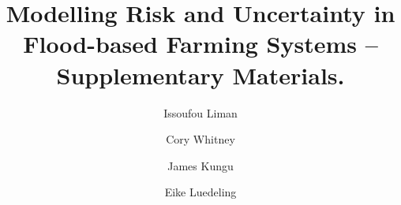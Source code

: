 \documentclass[]{elsarticle} %
\begin{document}
\begin{frontmatter}

  \title{Modelling Risk and Uncertainty in Flood-based Farming Systems -- Supplementary Materials.}
    \author[ICRAF,KU]{Issoufou Liman}
    \author[ICRAF,ZEF]{Cory Whitney}
    \author[KU]{James Kungu}
    \author[INRES]{Eike Luedeling}
      \address[KU]{Kenyatta University, Department of Environmental Sciences}
    \address[ICRAF]{World Agroforestry Centre (ICRAF), United Nations Avenue, Gigiri, P. O. Box 30677-00100, Nairobi, Kenya}
    \address[INRES]{University of Bonn, Department of Horticultural Sciences, Auf dem Hügel 6, D-53121, Bonn, Germany}
    \address[ZEF]{Center for Development research (ZEF), University of Bonn, Genscherallee 3, D-53113, Bonn, Germany}
    

\end{frontmatter}
\end{document}
